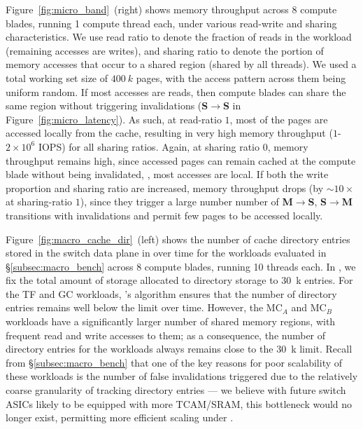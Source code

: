  Figure~\ref{fig:micro_band}~(right) shows \mind memory throughput across 8 compute blades, running 1 compute thread each, under various read-write and sharing characteristics. We use read ratio to denote the fraction of reads in the workload (remaining accesses are writes), and sharing ratio to denote the portion of memory accesses that occur to a shared region (shared by all threads). We used a total working set size of $400~k$ pages, with the access pattern across them being uniform random. If most accesses are reads, then compute blades can share the same region without triggering invalidations (\textbf{S}$\rightarrow$\textbf{S} in Figure~\ref{fig:micro_latency}). As such, at read-ratio $1$, most of the pages are accessed locally from the cache, resulting in very high memory throughput ($1$-$2\times 10^{6}$ IOPS) for all sharing ratios. Again, at sharing ratio $0$, memory throughput remains high, since accessed pages can remain cached at the compute blade without being invalidated, \ie, most accesses are local. If both the write proportion and sharing ratio are increased, memory throughput drops (by ${\sim} 10\times$ at sharing-ratio $1$), since they trigger a large number number of \textbf{M}$\rightarrow$\textbf{S}, \textbf{S}$\rightarrow$\textbf{M} transitions with invalidations and permit few pages to be accessed locally.

 Figure~\ref{fig:macro_cache_dir}~(left) shows the number of cache directory entries stored in the switch data plane in \mind over time for the workloads evaluated in \S\ref{subsec:macro_bench} across 8 compute blades, running 10 threads each. In \mind, we fix the total amount of storage allocated to directory storage to $30$~k entries. For the TF and GC workloads, \mind's \algo algorithm ensures that the number of directory entries remains well below the limit over time. However, the MC$_{A}$ and MC$_{B}$ workloads have a significantly larger number of shared memory regions, with frequent read and write accesses to them; as a consequence, the number of directory entries for the workloads always remains close to the $30$~k limit. Recall from \S\ref{subsec:macro_bench} that one of the key reasons for poor scalability of these workloads is the number of false invalidations triggered due to the relatively coarse granularity of tracking directory entries --- we believe with future switch ASICs likely to be equipped with more TCAM/SRAM, this bottleneck would no longer exist, permitting more efficient scaling under \mind.

